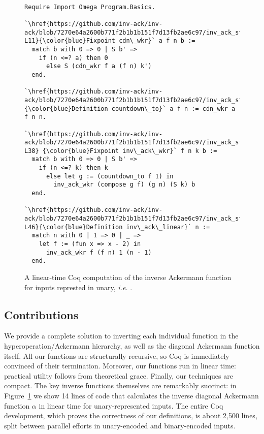 \begin{figure}
\lstset{style=myTinyStyle}
\begin{lstlisting}

Require Import Omega Program.Basics.

`\href{https://github.com/inv-ack/inv-ack/blob/7270e64a2600b771f2b1b1b151f7d13fb2ae6c97/inv_ack_standalone.v#L6-L11}{\color{blue}Fixpoint cdn\_wkr}` a f n b :=
  match b with 0 => 0 | S b' =>
    if (n <=? a) then 0
      else S (cdn_wkr f a (f n) k')
  end.

`\href{https://github.com/inv-ack/inv-ack/blob/7270e64a2600b771f2b1b1b151f7d13fb2ae6c97/inv_ack_standalone.v#L14}{\color{blue}Definition countdown\_to}` a f n := cdn_wkr a f n n.

`\href{https://github.com/inv-ack/inv-ack/blob/7270e64a2600b771f2b1b1b151f7d13fb2ae6c97/inv_ack_standalone.v#L32-L38} {\color{blue}Fixpoint inv\_ack\_wkr}` f n k b :=
  match b with 0 => 0 | S b' =>
    if (n <=? k) then k
      else let g := (countdown_to f 1) in
        inv_ack_wkr (compose g f) (g n) (S k) b
  end.

`\href{https://github.com/inv-ack/inv-ack/blob/7270e64a2600b771f2b1b1b151f7d13fb2ae6c97/inv_ack_standalone.v#L42-L46}{\color{blue}Definition inv\_ack\_linear}` n :=
  match n with 0 | 1 => 0 | _ => 
    let f := (fun x => x - 2) in
      inv_ack_wkr f (f n) 1 (n - 1)
  end.
\end{lstlisting}
\caption{A linear-time Coq computation of the inverse Ackermann function for inputs represted in unary, \emph{i.e.} .}
\label{fig:standalone}
\end{figure}

\subsection{Contributions}
We provide a complete solution to inverting each individual function in the hyperoperation/Ackermann hierarchy,
as well as the diagonal Ackermann function itself.  All our functions are structurally recursive, so
Coq is immediately convinced of their termination.  Moreover, our functions run in linear time: practical utility follows from theoretical grace.
Finally, our techniques are compact.  The key inverse functions themselves are remarkably succinct: in Figure~\ref{fig:standalone} we show 14 lines of code that calculates the inverse diagonal Ackermann function $\alpha$ in linear time for unary-represented inputs. The entire Coq development, which proves the correctness of our definitions, is about 2,500 lines, split between parallel efforts in unary-encoded and binary-encoded inputs.


